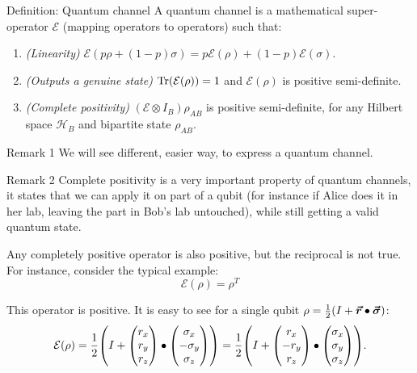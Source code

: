 \documentclass[a4paper]{article}
\begin{document}
\begin{parag}{Definition: Quantum channel}
    A quantum channel is a mathematical super-operator $\mathcal{E}$ (mapping operators to operators) such that:
    \begin{enumerate}
        \item \textit{(Linearity)} $\mathcal{E}\left(p \rho + \left(1 - p\right) \sigma\right) = p \mathcal{E}\left(\rho\right) + \left(1-p\right) \mathcal{E}\left(\sigma\right)$.
        \item \textit{(Outputs a genuine state)} $\Tr\left(\mathcal{E}\left(\rho\right)\right) = 1$ and $\mathcal{E}\left(\rho\right)$ is positive semi-definite.
        \item \textit{(Complete positivity)} $\left(\mathcal{E} \otimes I_B\right) \rho_{AB}$ is positive semi-definite, for any Hilbert space $\mathcal{H}_B$ and bipartite state $\rho_{AB}$.
    \end{enumerate}

    \begin{subparag}{Remark 1}
        We will see different, easier way, to express a quantum channel.
    \end{subparag}

    \begin{subparag}{Remark 2}
        Complete positivity is a very important property of quantum channels, it states that we can apply it on part of a qubit (for instance if Alice does it in her lab, leaving the part in Bob's lab untouched), while still getting a valid quantum state. 

        Any completely positive operator is also positive, but the reciprocal is not true. For instance, consider the typical example: 
        \[\mathcal{E}\left(\rho\right) = \rho^T\]

        This operator is positive. It is easy to see for a single qubit $\rho = \frac{1}{2} \left(I + \bvec{r} \dotprod \bvec{\sigma}\right)$: 
        \[\mathcal{E}\left(\rho\right) = \frac{1}{2}\left(I + \begin{pmatrix} r_x \\ r_y \\ r_z \end{pmatrix} \dotprod \begin{pmatrix} \sigma_x \\ -\sigma_y \\ \sigma_z \end{pmatrix} \right) = \frac{1}{2}\left(I + \begin{pmatrix} r_x \\ -r_y \\ r_z \end{pmatrix} \dotprod \begin{pmatrix} \sigma_x \\ \sigma_y \\ \sigma_z \end{pmatrix} \right).\]
        

\end{subparag}
\end{parag}
\end{document}
